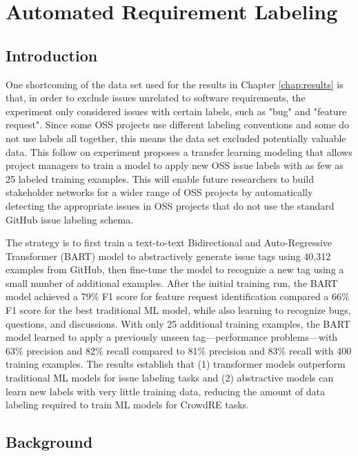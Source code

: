 \doublespacing
\chapter{Automated Requirement Labeling} \label{chap:labeling}

\section{Introduction}
\label{intro}

One shortcoming of the data set used for the results in Chapter \ref{chap:results} is that, in order to exclude issues unrelated to software requirements, the experiment only considered issues with certain labels, such as "bug" and "feature request". Since some OSS projects use different labeling conventions and some do not use labels all together, this means the data set excluded potentially valuable data. This follow on experiment proposes a transfer learning modeling that allows project managers to train a model to apply new OSS issue labels with as few as 25 labeled training examples. This will enable future researchers to build stakeholder networks for a wider range of OSS projects by automatically detecting the appropriate issues in OSS projects that do not use the standard GitHub issue labeling schema.

The strategy is to first train a text-to-text Bidirectional and Auto-Regressive Transformer (BART) model to abstractively generate issue tags using 40,312 examples from GitHub, then fine-tune the model to recognize a new tag using a small number of additional examples. After the initial training run, the BART model achieved a 79\% F1 score for feature request identification compared a 66\% F1 score for the best traditional ML model, while also learning to recognize bugs, questions, and discussions. With only 25 additional training examples, the BART model learned to apply a previously unseen tag---performance problems---with 63\% precision and 82\% recall compared to 81\% precision and 83\% recall with 400 training examples. The results establish that (1) transformer models outperform traditional ML models for issue labeling tasks and (2) abstractive models can learn new labels with very little training data, reducing the amount of data labeling required to train ML models for CrowdRE tasks.

\section{Background}
\label{litreview}


